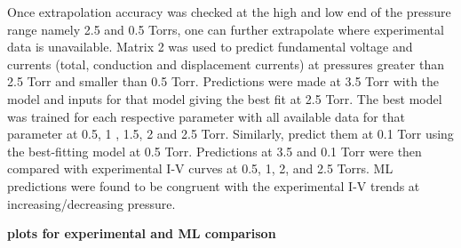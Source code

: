 \documentclass[12pt]{iopart}
\begin{document}


Once extrapolation accuracy was checked at the high and low end of the pressure range namely 2.5 and 0.5 Torrs, one can further extrapolate where experimental data is unavailable. Matrix 2 was used to predict fundamental voltage and currents (total, conduction and displacement currents) at pressures greater than 2.5 Torr and smaller than 0.5 Torr. Predictions were made at 3.5 Torr with the model and inputs for that model giving the best fit at 2.5 Torr. The best model was trained for each respective parameter with all available data for that parameter at 0.5, 1 , 1.5, 2 and 2.5 Torr. Similarly, predict them at 0.1 Torr using the best-fitting model at 0.5 Torr. Predictions at 3.5 and 0.1 Torr were then compared with experimental I-V curves at 0.5, 1, 2, and 2.5 Torrs. ML predictions were found to be congruent with the experimental I-V trends at increasing/decreasing pressure.

\textbf{plots for experimental and ML comparison}
\end{document}
